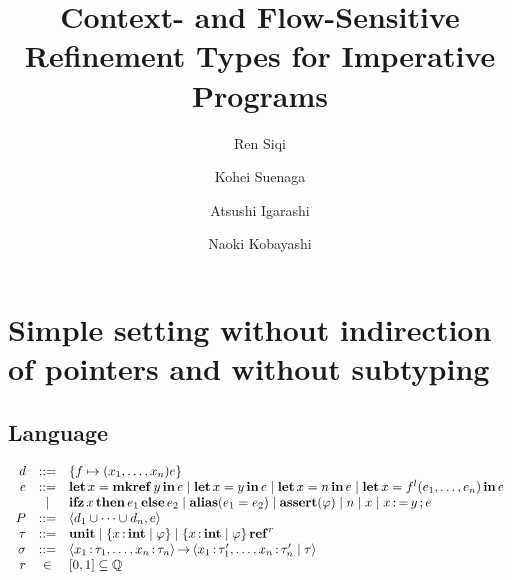 \documentclass[runningheads]{llncs}
\begin{document}
%
\title{Context- and Flow-Sensitive Refinement Types for Imperative Programs}
%
%
\author{Ren Siqi \and Kohei Suenaga \and Atsushi Igarashi \and Naoki Kobayashi}
%
%
\institute{}
%
\maketitle              %
%
\begin{abstract}

\keywords{}
\end{abstract}
%
%
%

\section{Simple setting without indirection of pointers and without subtyping}

\subsection{Language}

\[
\begin{array}{rcl}  
  d &::=& \left\{{f \mapsto (x_1,\dots,x_n)e}\right\}\\
  e &::=& \operatorname{\mathbf{let}} x = \operatorname{\mathbf{mkref}} y \operatorname{\mathbf{in}} e \mid \operatorname{\mathbf{let}} x = y \operatorname{\mathbf{in}} e \mid \operatorname{\mathbf{let}} x = n \operatorname{\mathbf{in}} e \mid \operatorname{\mathbf{let}} x = f^l(e_1,\dots,e_n) \operatorname{\mathbf{in}} e\\
        &\mid& \operatorname{\mathbf{ifz}} x \operatorname{\mathbf{then}} e_1 \operatorname{\mathbf{else}} e_2 \mid \mathbf{alias}(e_1 = e_2) \mid \mathbf{assert}(\varphi) \mid n \mid x \mid x \operatorname{:=} y \operatorname{;} e\\
  P &::=& \left\langle{d_1 \cup \dots \cup d_n, e}\right\rangle\\
  \tau &::=& \mathbf{unit} \mid \left\{{x \operatorname{:} \mathbf{int} \mid \varphi}\right\} \mid \left\{{x \operatorname{:} \mathbf{int} \mid \varphi}\right\} \operatorname{\mathbf{ref}}^{r}\\
  \sigma &::=& \left\langle{x_1\operatorname{:}\tau_1,\dots,x_n\operatorname{:}\tau_n}\right\rangle\operatorname{\rightarrow}\left\langle{x_1\operatorname{:}\tau_1',\dots,x_n\operatorname{:}\tau_n' \mid \tau}\right\rangle\\
  r &\in& [0,1] \subseteq \mathbb{Q}\\
\end{array}
\]
\end{document}

